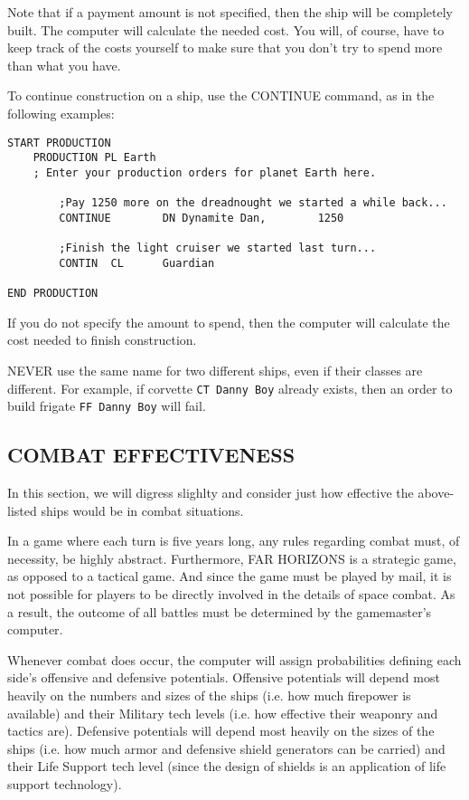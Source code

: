 \documentclass[10pt,titlepage]{article}
\begin{document}
Note that if a payment amount is not specified, then the ship will be
completely built.  The computer will calculate the needed cost.  You will, of
course, have to keep track of the costs yourself to make sure that you don't
try to spend more than what you have.

To continue construction on a ship, use the CONTINUE command, as in the
following examples:
\begin{verbatim}
START PRODUCTION
    PRODUCTION PL Earth
    ; Enter your production orders for planet Earth here.

        ;Pay 1250 more on the dreadnought we started a while back...
        CONTINUE        DN Dynamite Dan,        1250

        ;Finish the light cruiser we started last turn...
        CONTIN  CL      Guardian

END PRODUCTION

\end{verbatim}
If you do not specify the amount to spend, then the computer will calculate
the cost needed to finish construction.

NEVER use the same name for two different ships, even if their classes are
different.  For example, if corvette \texttt{CT Danny Boy} already exists, then an
order to build frigate \texttt{FF Danny Boy} will fail.


\subsection{COMBAT EFFECTIVENESS}
\label{sec:combateffectiveness}


In this section, we will digress slighlty and consider just how effective the
above-listed ships would be in combat situations.

In a game where each turn is five years long, any rules regarding combat must,
of necessity, be highly abstract.  Furthermore, FAR HORIZONS is a strategic
game, as opposed to a tactical game.  And since the game must be played by
mail, it is not possible for players to be directly involved in the details of
space combat.  As a result, the outcome of all battles must be determined by
the gamemaster's computer.

Whenever combat does occur, the computer will assign probabilities defining
each side's offensive and defensive potentials.  Offensive potentials will
depend most heavily on the numbers and sizes of the ships (i.e. how much
firepower is available) and their Military tech levels (i.e. how effective
their weaponry and tactics are).  Defensive potentials will depend most heavily
on the sizes of the ships (i.e. how much armor and defensive shield generators
can be carried) and their Life Support tech level (since the design of shields
is an application of life support technology).
\end{document}
